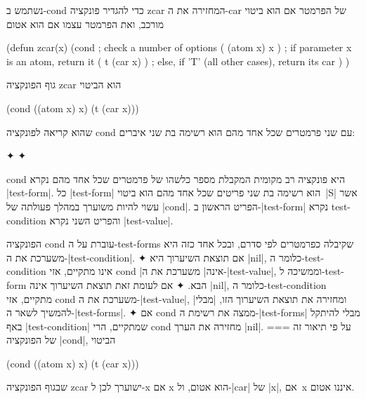 נשתמש ב-cond כדי להגדיר פונקציה zcar המחזירה את ה-car של הפרמטר אם
הוא ביטוי מורכב, ואת הפרמטר עצמו אם הוא אטום
\begin{LISP}
(defun zcar(x) 
  (cond             ; check a number of options  
    ( (atom x)  x      ) ; if parameter x is an atom, return it  
    ( t        (car x) ) ; else, if 'T' (all other cases), return its car 
  )
)
\end{LISP}
גוף הפונקציה zcar הוא הביטוי
\begin{LISP}
  (cond ((atom x) x) (t (car x)))
\end{LISP}
שהוא קריאה לפונקציה cond עם שני פרמטרים שכל אחד מהם הוא רשימה בת שני איברים:
\begin{LTR}
  \begin{itemize}
    ✦ 
    ✦ 
  \end{itemize}
\end{LTR}
cond היא פונקציה רב מקומית המקבלת מספר כלשהו של פרמטרים שכל אחד מהם נקרא
\E|test-form|. כל \E|test-form| הוא רשימה בת שני פריטים שכל אחד מהם הוא ביטוי~\E|S|
אשר עשוי להיות משוערך במהלך פעולתה של \E|cond|. הפריט הראשון ב-\E|test-form|
נקרא test-condition והפריט השני נקרא \E|test-value|.

הפונקציה cond עוברת על ה-test-forms שקיבלה כפרמטרים לפי סדרם, ובכל אחד כזה היא
משערכת את ה-\E|test-condition|.
✦ אם תוצאת השיערוך היא \E|nil|, כלומר ה-test-condition אינו מתקיים, אזי cond
\ע|אינה| משערכת את ה-\E|test-value|, וממשיכה ל-test-form הבא.
✦ אם לעומת זאת תוצאת השיערוך אינה \E|nil|, כלומר ה-test-condition מתקיים, אזי
cond משערכת את ה-\E|test-value|, ומחזירה את תוצאת השיערוך הזו, \ע|מבלי|
להמשיך לשאר ה-\E|test-forms|.
✦ אם cond ממצה את רשימת ה-\E|test-forms| מבלי להיתקל באף \E|test-condition|
שמתקיים, הרי cond מחזירה את הערך \E|nil|.
===
על פי תיאור זה של הפונקציה \E|cond|, הביטוי \begin{LISP}
  (cond ((atom x) x) (t (car x)))
\end{LISP}
שבגוף הפונקציה zcar ישוערך לכן ל-x אם x הוא אטום, ול-\E|car| של \E|x|, אם~x
איננו אטום.

